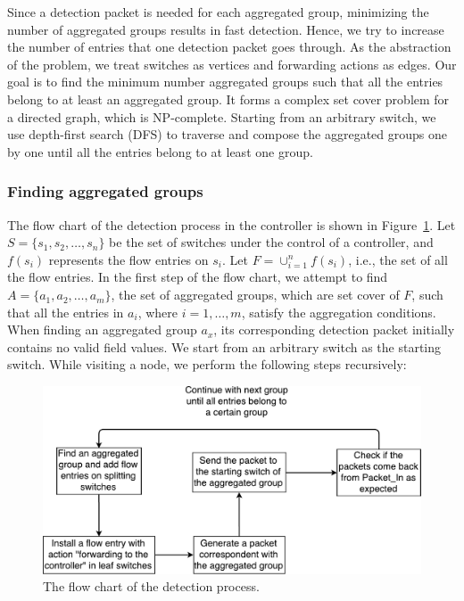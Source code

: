 \documentclass[conference]{IEEEtran}
\begin{document}
\setlength{\textfloatsep}{4pt}
\setlength{\floatsep}{4pt}
\setlength{\intextsep}{3pt}
\setlength{\dbltextfloatsep}{4pt}
\setlength{\dblfloatsep}{4pt}

Since a detection packet is needed for each aggregated group, minimizing the number of aggregated groups results in fast detection. Hence, we try to increase the number of entries that one detection packet goes through. As the abstraction of the problem, we treat switches as vertices and forwarding actions as edges. Our goal is to find the minimum number aggregated groups such that all the entries belong to at least an aggregated group. It forms a complex set cover problem for a directed graph, which is NP-complete. Starting from an arbitrary switch, we use depth-first search (DFS) to traverse and compose the aggregated groups one by one until all the entries belong to at least one group. 

\subsubsection{Finding aggregated groups}
\label{Aggregated_group_finding}

The flow chart of the detection process in the controller is shown in Figure~\ref{flow_entry_detection_flowchart}. Let $S=\{s_1,s_2,\ldots,s_n\}$ be the set of switches under the control of a controller, and $f(s_i)$ represents the flow entries on $s_i$. Let $F=\cup_{i=1}^n f(s_i)$, i.e., the set of all the flow entries. In the first step of the flow chart, we attempt to find $A=\{a_1, a_2, \ldots, a_m\}$, the set of aggregated groups, which are set cover of $F$, such that all the entries in $a_i$, where $i=1,\ldots,m$, satisfy the aggregation conditions. When finding an aggregated group $a_x$, its corresponding detection packet initially contains no valid field values. We start from an arbitrary switch as the starting switch. While visiting a node, we perform the following steps recursively:

\begin{figure}[ht]
\centering
\includegraphics[width=1\linewidth]{figures/flow_entry_detection_flowchart}
\caption{The flow chart of the detection process.}
\label{flow_entry_detection_flowchart}
\end{figure}
\end{document}
